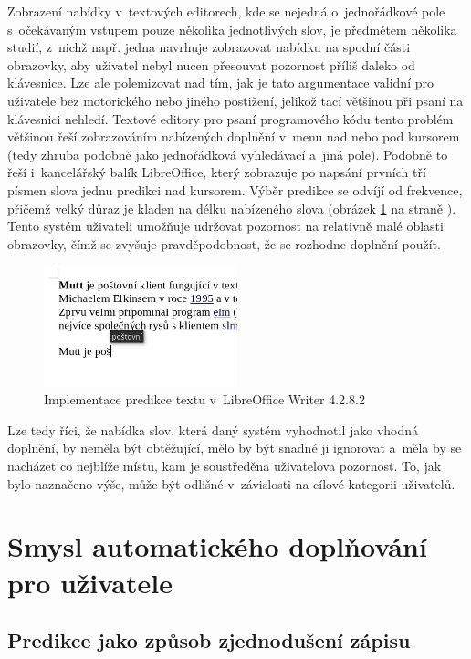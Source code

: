 \documentclass[a4paper,11pt,openany]{book} %
\begin{document}
Zobrazení nabídky v~textových editorech, kde se nejedná o~jednořádkové pole s~očekávaným vstupem pouze několika jednotlivých slov, je předmětem několika studií, z~nichž např. jedna navrhuje zobrazovat nabídku na spodní části obrazovky, aby uživatel nebyl nucen přesouvat pozornost příliš daleko od klávesnice. %
Lze ale polemizovat nad tím, jak je tato argumentace validní pro uživatele bez motorického nebo jiného postižení, jelikož tací většinou při psaní na klávesnici nehledí. Textové editory pro psaní programového kódu tento problém většinou řeší zobrazováním nabízených doplnění v~menu nad nebo pod kursorem (tedy zhruba podobně jako jednořádková vyhledávací a~jiná pole). Podobně to řeší i~kancelářský balík LibreOffice, který zobrazuje po napsání prvních tří písmen slova jednu predikci nad kursorem. Výběr predikce se odvíjí od frekvence, přičemž velký důraz je kladen na délku nabízeného slova (obrázek \ref{fig:LOpredict} na straně \pageref{fig:LOpredict}). Tento systém uživateli umožňuje udržovat pozornost na relativně malé oblasti obrazovky, čímž se zvyšuje pravděpodobnost, že se rozhodne doplnění použít. 

\begin{figure}[h]
	\centering
	\includegraphics[width=0.5\textwidth]{LO_prediction_1}
	\caption{Implementace predikce textu v~LibreOffice Writer 4.2.8.2}
	\label{fig:LOpredict}
\end{figure}

Lze tedy říci, že nabídka slov, která daný systém vyhodnotil jako vhodná doplnění, by neměla být obtěžující, mělo by být snadné ji ignorovat a~měla by se nacházet co nejblíže místu, kam je soustředěna uživatelova pozornost. To, jak bylo naznačeno výše, může být odlišné v~závislosti na cílové kategorii uživatelů.

\chapter{Smysl automatického doplňování pro uživatele}

\section{Predikce jako způsob zjednodušení zápisu}
\end{document}
